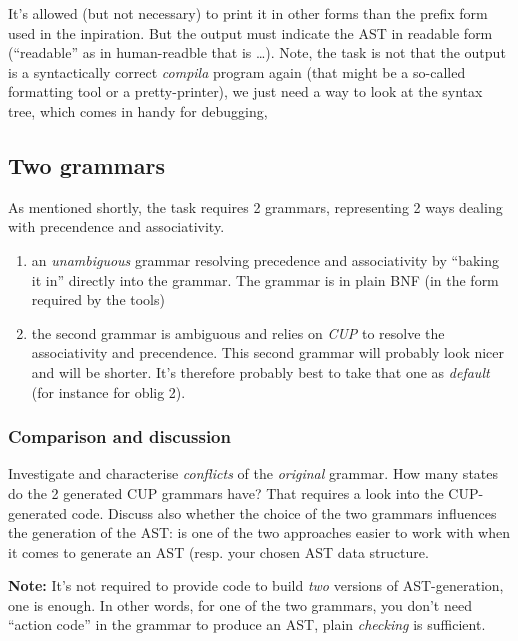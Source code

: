 \documentclass[10pt,freeform]{handout}[2014/08/13]
\begin{document}
It's allowed (but not necessary) to print it in other forms than the prefix
form used in the inpiration. But the output must indicate the AST in
readable form (``readable'' as in human-readble that is \ldots). Note, the
task is not that the output is a syntactically correct \textsl{compila}
program again (that might be a so-called formatting tool or a
pretty-printer), we just need a way to look at the syntax tree, which comes
in handy for debugging,


%
% 

\subsection{Two grammars}
\label{sec:two-grammars}


As mentioned shortly, the task requires 2 grammars, representing 2 ways
dealing with precendence and associativity.

\begin{enumerate}
\item an \emph{unambiguous} grammar resolving precedence and associativity
  by ``baking it in'' directly into the grammar. The grammar is in plain
  BNF (in the form required by the tools)
\item the second grammar is ambiguous and relies on \emph{CUP} to resolve
  the associativity and precendence. This second grammar will probably look
  nicer and will be shorter. It's therefore probably best to take that one
  as \emph{default} (for instance for oblig 2).
\end{enumerate}

\subsubsection*{Comparison and discussion}
\label{sec:comparison}

Investigate and characterise \emph{conflicts} of the \emph{original}
grammar. How many states do the 2 generated CUP grammars have? That
requires a look into the CUP-generated code. Discuss also whether the
choice of the two grammars influences the generation of the AST: is one of
the two approaches easier to work with when it comes to generate an AST
(resp. your chosen AST data structure.


\textbf{Note:} It's not required to provide code to build \emph{two}
versions of AST-generation, one is enough. In other words, for one of the
two grammars, you don't need ``action code'' in the grammar to produce an
AST, plain \emph{checking} is sufficient.
\end{document}
